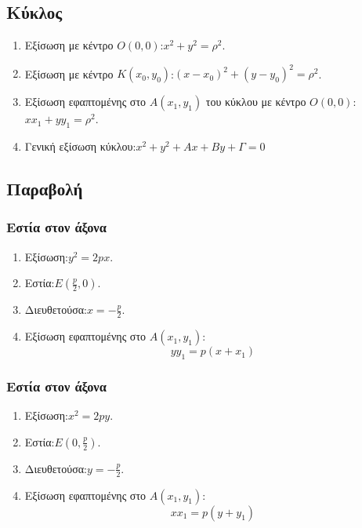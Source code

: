 \documentclass[11pt,a4paper]{article}
\begin{document}
\subsection{Κύκλος}
\begin{enumerate}
\item Εξίσωση με κέντρο $ O(0,0) $:\quad $ x^2+y^2=\rho^2 $.
\item Εξίσωση με κέντρο $ K(x_0,y_0) $:\quad $ (x-x_0)^2+(y-y_0)^2=\rho^2 $.
\item Εξίσωση εφαπτομένης στο $ A(x_1,y_1) $ του κύκλου με κέντρο $ O(0,0) $:\quad $ xx_1+yy_1=\rho^2 $.
\item Γενική εξίσωση κύκλου:\quad $ x^2+y^2+Ax+By+\varGamma=0 $
\end{enumerate}
\subsection{Παραβολή}
\begin{multicols}{2}
\subsubsection{Εστία στον άξονα }
\begin{enumerate}
\item Εξίσωση:\quad $ y^2=2px $.
\item Εστία:\quad $ E\left(\frac{p}{2},0 \right) $.
\item Διευθετούσα:\quad $ x=-\frac{p}{2} $.
\item Εξίσωση εφαπτομένης στο $ A(x_1,y_1) $: \[ yy_1=p(x+x_1) \]
\end{enumerate}
\subsubsection{Εστία στον άξονα }
\begin{enumerate}
\item Εξίσωση:\quad $ x^2=2py $.
\item Εστία:\quad $ E\left(0,\frac{p}{2}\right) $.
\item Διευθετούσα:\quad $ y=-\frac{p}{2} $.
\item Εξίσωση εφαπτομένης στο $ A(x_1,y_1) $: \[ xx_1=p(y+y_1) \]
\end{enumerate}
\end{multicols}
\end{document}

